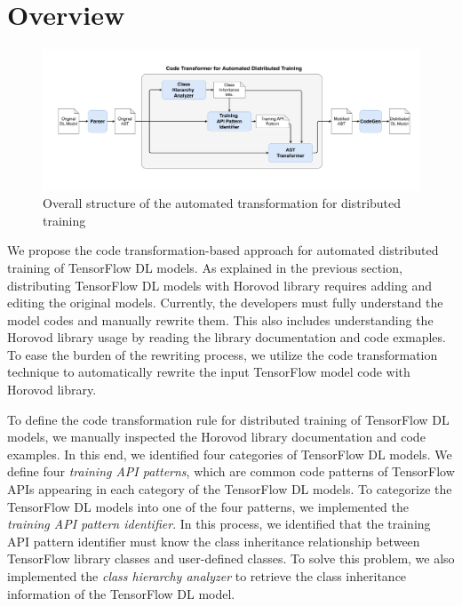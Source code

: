 \section{Overview}
 
\begin{figure}[ht!]
  \centering
  \includegraphics[width=\textwidth]{overview_diagram.pdf}
  \caption{Overall structure of the 
  automated transformation for distributed training}
  \label{sysarch}
\end{figure}


We propose the code transformation-based approach 
for automated distributed training of TensorFlow DL models.
As explained in the previous section, distributing TensorFlow DL models
with Horovod library requires adding and editing the original models.
Currently, the developers must fully understand the model codes and
manually rewrite them.
This also includes understanding the Horovod library usage by reading
the library documentation and code exmaples.
To ease the burden of the rewriting process, 
we utilize the code transformation technique to automatically rewrite the
input TensorFlow model code with Horovod library.

To define the code transformation rule for distributed training of 
TensorFlow DL models,
we manually inspected the Horovod library documentation and code examples.
In this end, we identified four categories of TensorFlow DL models.
We define four \textit{training API patterns}, which are common code patterns of 
TensorFlow APIs appearing in each category of the TensorFlow DL models.
To categorize the TensorFlow DL models into one of the four patterns, 
we implemented the \textit{training API pattern identifier}. 
In this process, we identified that the training API pattern identifier 
must know the class inheritance relationship between TensorFlow library 
classes and user-defined classes.
To solve this problem, we also implemented the \textit{class hierarchy analyzer}
to retrieve the class inheritance information of the TensorFlow DL model.



